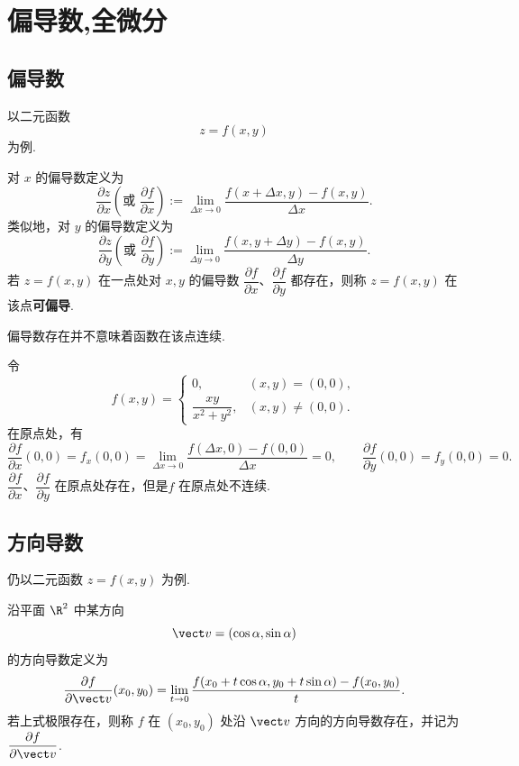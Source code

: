 \section{偏导数,全微分}

\subsection*{偏导数}

以二元函数
\[
z=f(x,y)
\]
为例.

\begin{definition}
	对 $x$ 的偏导数定义为
\[
\frac{\partial z}{\partial x}\left(\text{或 }\frac{\partial f}{\partial x}\right)
:=\lim_{\Delta x\to0}\frac{f(x+\Delta x,y)-f(x,y)}{\Delta x}.
\]
类似地，对 $y$ 的偏导数定义为
\[
\frac{\partial z}{\partial y}\left(\text{或 }\frac{\partial f}{\partial y}\right)
:=\lim_{\Delta y\to0}\frac{f(x,y+\Delta y)-f(x,y)}{\Delta y}.
\]
若 $z=f(x,y)$ 在一点处对 $x,y$ 的偏导数 $\dfrac{\partial f}{\partial x}$、$\dfrac{\partial f}{\partial y}$ 都存在，则称 $z=f(x,y)$ 在该点\textbf{可偏导}.

\end{definition}
偏导数存在并不意味着函数在该点连续.

\begin{example}
	令
\[
f(x,y)=
\begin{cases}
0,&(x,y)=(0,0),\\[4pt]
\dfrac{xy}{x^2+y^2},&(x,y)\ne(0,0).
\end{cases}
\]
在原点处，有
\[
\frac{\partial f}{\partial x}(0,0)=f_x(0,0)
=\lim_{\Delta x\to0}\frac{f(\Delta x,0)-f(0,0)}{\Delta x}=0,
\qquad
\frac{\partial f}{\partial y}(0,0)=f_y(0,0)=0.
\]
$\dfrac{\partial f}{\partial x}$、$\dfrac{\partial f}{\partial y}$ 在原点处存在，但是$f$ 在原点处不连续.
\end{example}
\subsection*{方向导数}

仍以二元函数 $z=f(x,y)$ 为例.

\begin{definition}
	沿平面 $\R^2$ 中某方向
\[
\vect v=(\cos\alpha,\sin\alpha)
\]
的方向导数定义为
\[
\frac{\partial f}{\partial\vect v}(x_0,y_0)
=\lim_{t\to0}
\frac{f(x_0+t\cos\alpha,y_0+t\sin\alpha)-f(x_0,y_0)}{t}.
\]
若上式极限存在，则称 $f$ 在 $(x_0,y_0)$ 处沿 $\vect v$ 方向的方向导数存在，并记为 $\dfrac{\partial f}{\partial\vect v}$.
\end{definition}

